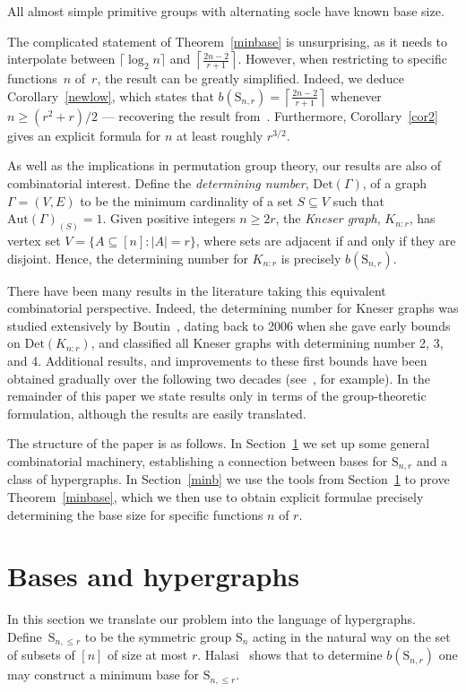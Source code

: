 \documentclass[ALCO,published]{cedram}
\renewcommand\S{\mathrm{S}}
\newcommand\Aut{\mathrm{Aut}}
\begin{document}
\begin{coro}
All almost simple primitive groups with alternating socle have known base size.
\end{coro}

The complicated statement of Theorem~\ref{minbase} is unsurprising, as it needs to interpolate between $\lceil \log_2 n\rceil$ and $\left\lceil\frac{2n-2}{r+1}\right\rceil$. However, when restricting to specific functions~$n$ of~$r$, the result can be greatly simplified. Indeed, we deduce Corollary~\ref{newlow}, which states that $b(\S_{n,r})=\left\lceil\frac{2n-2}{r+1}\right\rceil$ whenever $n\geq (r^2+r)/2$ --- recovering the result from~\cite{cac}. Furthermore, Corollary~\ref{cor2} gives an explicit formula for $n$ at least roughly $r^{3/2}$.

As well as the implications in permutation group theory, our results are also of combinatorial interest. Define the \emph{determining number}, $\mathrm{Det}(\Gamma)$, of a graph $\Gamma=(V,E)$ to be the minimum cardinality of a set $S\subseteq V$ such that $\Aut(\Gamma)_{(S)}=1$. Given positive integers $n\geq 2r$, the \emph{Kneser graph}, $K_{n:r}$, has vertex set $V=\{A\subseteq [n] : |A|=r\}$, where sets are adjacent if and only if they are disjoint. Hence, the determining number for $K_{n:r}$ is precisely $b(\S_{n,r})$. 

There have been many results in the literature taking this equivalent combinatorial perspective. Indeed, the determining number for Kneser graphs was studied extensively by Boutin~\cite{bou}, dating back to 2006 when she gave early bounds on $\mathrm{Det}(K_{n:r})$, and classified all Kneser graphs with determining number 2, 3, and 4. Additional results, and improvements to these first bounds have been obtained gradually over the following two decades (see~\cite{cac}, for example). In the remainder of this paper we state results only in terms of the group-theoretic formulation, although the results are easily translated.

The structure of the paper is as follows. In Section~\ref{mach} we set up some general combinatorial machinery, establishing a connection between bases for $\S_{n,r}$ and a class of hypergraphs. In Section~\ref{minb} we use the tools from Section~\ref{mach} to prove Theorem~\ref{minbase}, which we then use to obtain explicit formulae precisely determining the base size for specific functions $n$ of $r$.

\section{Bases and hypergraphs}\label{mach}
In this section we translate our problem into the language of hypergraphs. Define~$\mathrm{S}_{n,\leq r}$ to be the symmetric group $\mathrm{S}_n$ acting in the natural way on the set of subsets of $[n]$ of size at most $r$. Halasi~\cite{hal} shows that to determine $b(\S_{n,r})$ one may construct a minimum base for $\mathrm{S}_{n,\leq r}$.
\end{document}

